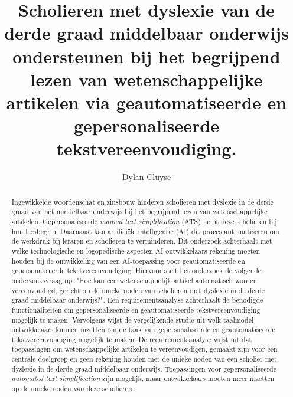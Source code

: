 \documentclass[a0,portrait]{hogent-poster}
\title{Scholieren met dyslexie van de derde graad middelbaar onderwijs ondersteunen bij het begrijpend lezen van wetenschappelijke artikelen via geautomatiseerde en gepersonaliseerde tekstvereenvoudiging.}
\subtitle{}
\author{Dylan Cluyse}
\begin{document}
\maketitle

\begin{abstract}
Ingewikkelde woordenschat en zinsbouw hinderen scholieren met dyslexie in de derde graad van het middelbaar onderwijs bij het begrijpend lezen van wetenschappelijke artikelen. Gepersonaliseerde \textit{manual text simplification} (ATS) helpt deze scholieren bij hun leesbegrip. Daarnaast kan artificiële intelligentie (AI) dit proces automatiseren om de werkdruk bij leraren en scholieren te verminderen. Dit onderzoek achterhaalt met welke technologische en logopedische aspecten AI-ontwikkelaars rekening moeten houden bij de ontwikkeling van een AI-toepassing voor geautomatiseerde en gepersonaliseerde tekstvereenvoudiging. Hiervoor stelt het onderzoek de volgende onderzoeksvraag op: "Hoe kan een wetenschappelijk artikel automatisch worden vereenvoudigd, gericht op de unieke noden van scholieren met dyslexie in de derde graad middelbaar onderwijs?". Een requirementsanalyse achterhaalt de benodigde functionaliteiten om gepersonaliseerde en geautomatiseerde tekstvereenvoudiging mogelijk te maken. Vervolgens wijst de vergelijkende studie uit welk taalmodel ontwikkelaars kunnen inzetten om de taak van gepersonaliseerde en geautomatiseerde tekstvereenvoudiging mogelijk te maken. De requirementsanalyse wijst uit dat toepassingen om wetenschappelijke artikelen te vereenvoudigen, gemaakt zijn voor een centrale doelgroep en geen rekening houden met de unieke noden van een scholier met dyslexie in de derde graad middelbaar onderwijs. Toepassingen voor gepersonaliseerde \textit{automated text simplification} zijn mogelijk, maar ontwikkelaars moeten meer inzetten op de unieke noden van deze scholieren.
\end{abstract}
\end{document}
